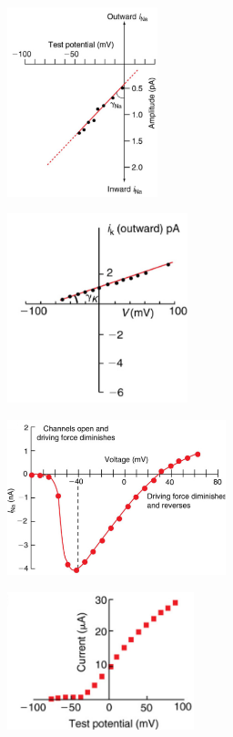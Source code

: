 \documentclass[class={myRUCProject}, crop=false]{standalone}
\begin{document}
\begin{figure}[H]
\centering
    \begin{subfigure}[t]{0.45\textwidth}
    \centering
    \caption{}\label{fig:unitcurNa}
      \includegraphics[height=5.5cm]{Pictures/Anakin/iNa-VNa.png}
    \end{subfigure}
    \hfill
    \begin{subfigure}[t]{0.45\textwidth}
    \centering
    \caption{}\label{fig:rangeThree}
      \includegraphics[height=5.5cm]{Pictures/Anakin/I-V.K.png}
    \end{subfigure}

    
     \begin{subfigure}[t]{0.45\textwidth}
    \centering
    \caption{}\label{fig:IVdist.}
      \includegraphics[height=4.5cm]{Pictures/Anakin/I-V.bell.png}
    \end{subfigure}
     \begin{subfigure}[t]{0.45\textwidth}
     \vspace{0.7em}
    \centering
    \caption{}\label{fig:Kcurrent}
      \includegraphics[height=4cm]{Pictures/Anakin/IK-V.png}
    \end{subfigure}
    

\end{figure}
\end{document}
